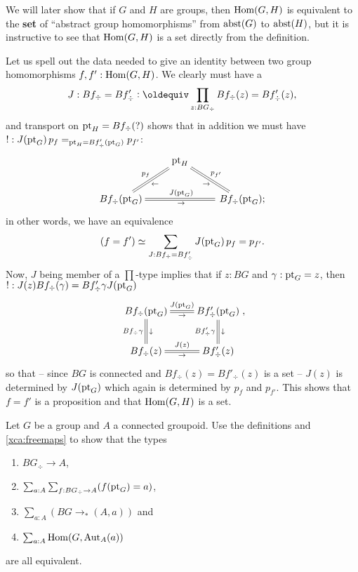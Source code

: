 \begin{example}
  We will later show that if $G$ and $H$ are groups, then $\mathrm{Hom}(G,H)$ is equivalent to the {\bf set} of ``abstract group homomorphisms'' from $\mathrm{abst}(G)$ to $\mathrm{abst}(H)$, but it is instructive to see that $\mathrm{Hom}(G,H)$ is a set directly from the definition.

  Let us spell out the data needed to give an identity between two group homomorphisms $f,f':\mathrm{Hom}(G,H)$.  
We clearly must have a
$$J:Bf_\div=Bf_\div'\defequi\prod_{z:BG_\div}Bf_\div(z)=Bf'_\div(z),$$ and transport on ${\mathord{\mathrm{pt}}}_H=Bf_\div(?)$ shows that in addition we must have $!:J({\mathord{\mathrm{pt}}}_G)\,p_f=_{{\mathord{\mathrm{pt}}}_H=Bf'_\div({\mathord{\mathrm{pt}}}_G)}p_{f'}$:
$$\xymatrix{&\pt_H\ar@{=}[dl]_{p_f}^\gets\ar@{=}[dr]^{p_{f'}}_\to&\\
Bf_\div(\pt_G)\ar@{=}[rr]^{J(\pt_G)}_\to&&\,Bf_\div(\pt_G);}
$$
in other words, we have an equivalence
$$(f=f')\simeq \sum_{J:Bf_\div=Bf'_\div}J({\mathord{\mathrm{pt}}}_G)\,p_f=p_{f'}.
$$
Now, $J$ being member of a $\prod$-type implies that if $z:BG$ and $\gamma:{\mathord{\mathrm{pt}}}_G=z$, then $!:J(z)Bf_\div(\gamma)=Bf'_\div\gamma J({\mathord{\mathrm{pt}}}_G)$
$$\xymatrix{
Bf_\div(\pt_G)\ar@{=}[r]^{J(\pt_G)}_\to\ar@{=}[d]^\downarrow_{Bf_\div\gamma}&
Bf'_\div(\pt_G)\ar@{=}[d]^\downarrow_{Bf'_\div\gamma}\\
Bf_\div(z)\ar@{=}[r]^{J(z)}_\to&Bf'_\div(z)},
$$
so that -- since $BG$ is connected and $Bf_\div(z)=Bf'_\div(z)$ is a set -- $J(z)$ is determined by $J({\mathord{\mathrm{pt}}}_G)$ which again is determined by $p_f$ and $p_{f'}$.  
This shows that $f=f'$ is a proposition and that $\mathrm{Hom}(G,H)$ is a set.

\end{example}


\begin{xca}\label{xca:BGtotype}
  Let $G$ be a group and $A$ a connected groupoid.  Use the definitions and \cref{xca:freemaps} to show that the types
  \begin{enumerate}
  \item $BG_\div\to A$, 
  \item $\sum_{a:A}\sum_{f:BG_\div \to A}(f({\mathord{\mathrm{pt}}}_G)=a)$, 
  \item $\sum_{a:A}(BG\to_*(A,a))$ and 
  \item $\sum_{a:A}\mathrm{Hom}(G,\mathrm{Aut}_A(a))$
  \end{enumerate}
 are all equivalent.
\end{xca}

